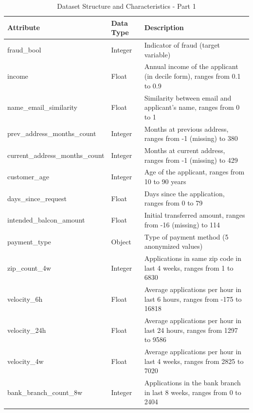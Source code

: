 \documentclass[12pt,a4paper]{report}
\begin{document}
\begin{table}[htbp]
    \centering
    \caption{Dataset Structure and Characteristics - Part 1}
    \begin{tabular}{|p{6cm}|p{3cm}|p{7cm}|}
        \hline
        \textbf{Attribute} & \textbf{Data Type} & \textbf{Description} \\ \hline
        fraud\_bool & Integer & Indicator of fraud (target variable) \\ \hline
        income & Float & Annual income of the applicant (in decile form), ranges from 0.1 to 0.9 \\ \hline
        name\_email\_similarity & Float & Similarity between email and applicant’s name, ranges from 0 to 1 \\ \hline
        prev\_address\_months\_count & Integer & Months at previous address, ranges from -1 (missing) to 380 \\ \hline
        current\_address\_months\_count & Integer & Months at current address, ranges from -1 (missing) to 429 \\ \hline
        customer\_age & Integer & Age of the applicant, ranges from 10 to 90 years \\ \hline
        days\_since\_request & Float & Days since the application, ranges from 0 to 79 \\ \hline
        intended\_balcon\_amount & Float & Initial transferred amount, ranges from -16 (missing) to 114 \\ \hline
        payment\_type & Object & Type of payment method (5 anonymized values) \\ \hline
        zip\_count\_4w & Integer & Applications in same zip code in last 4 weeks, ranges from 1 to 6830 \\ \hline
        velocity\_6h & Float & Average applications per hour in last 6 hours, ranges from -175 to 16818 \\ \hline
        velocity\_24h & Float & Average applications per hour in last 24 hours, ranges from 1297 to 9586 \\ \hline
        velocity\_4w & Float & Average applications per hour in last 4 weeks, ranges from 2825 to 7020 \\ \hline
        bank\_branch\_count\_8w & Integer & Applications in the bank branch in last 8 weeks, ranges from 0 to 2404 \\ \hline
    \end{tabular}
    \label{tab:data-understanding-part1}
\end{table}
\end{document}
